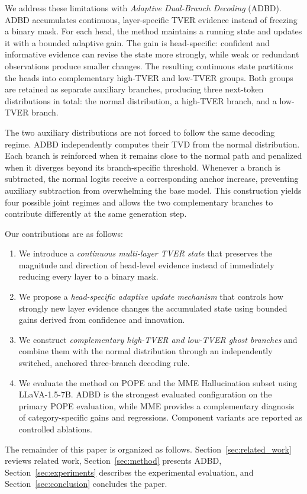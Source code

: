 We address these limitations with \emph{Adaptive Dual-Branch Decoding} (ADBD). ADBD accumulates continuous, layer-specific TVER evidence instead of freezing a binary mask. For each head, the method maintains a running state and updates it with a bounded adaptive gain. The gain is head-specific: confident and informative evidence can revise the state more strongly, while weak or redundant observations produce smaller changes. The resulting continuous state partitions the heads into complementary high-TVER and low-TVER groups. Both groups are retained as separate auxiliary branches, producing three next-token distributions in total: the normal distribution, a high-TVER branch, and a low-TVER branch.

The two auxiliary distributions are not forced to follow the same decoding regime. ADBD independently computes their TVD from the normal distribution. Each branch is reinforced when it remains close to the normal path and penalized when it diverges beyond its branch-specific threshold. Whenever a branch is subtracted, the normal logits receive a corresponding anchor increase, preventing auxiliary subtraction from overwhelming the base model. This construction yields four possible joint regimes and allows the two complementary branches to contribute differently at the same generation step.

Our contributions are as follows:
\begin{enumerate}
    \item We introduce a \emph{continuous multi-layer TVER state} that preserves the magnitude and direction of head-level evidence instead of immediately reducing every layer to a binary mask.
    \item We propose a \emph{head-specific adaptive update mechanism} that controls how strongly new layer evidence changes the accumulated state using bounded gains derived from confidence and innovation.
    \item We construct \emph{complementary high-TVER and low-TVER ghost branches} and combine them with the normal distribution through an independently switched, anchored three-branch decoding rule.
    \item We evaluate the method on POPE and the MME Hallucination subset using LLaVA-1.5-7B. ADBD is the strongest evaluated configuration on the primary POPE evaluation, while MME provides a complementary diagnosis of category-specific gains and regressions. Component variants are reported as controlled ablations.
\end{enumerate}

The remainder of this paper is organized as follows. Section~\ref{sec:related_work} reviews related work, Section~\ref{sec:method} presents ADBD, Section~\ref{sec:experiments} describes the experimental evaluation, and Section~\ref{sec:conclusion} concludes the paper.
